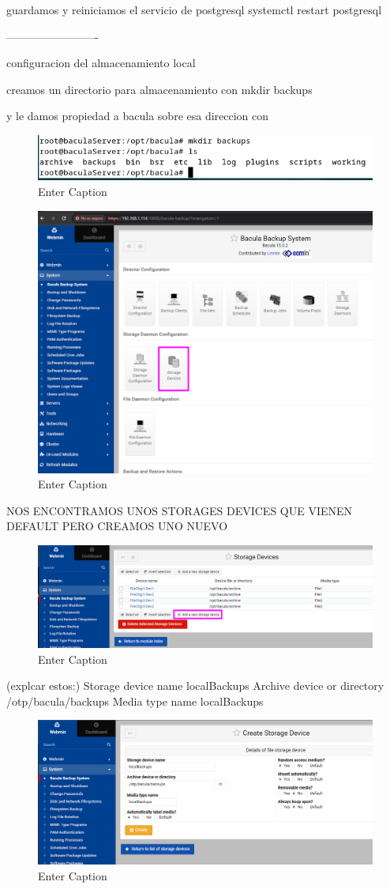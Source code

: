 guardamos y reiniciamos el servicio de postgresql
systemctl restart postgresql

-------------------------

configuracion del almacenamiento local

creamos un directorio para almacenamiento 
con mkdir backups

y le damos propiedad a bacula sobre esa direccion con 

\begin{figure}[H]
    \centering
    \includegraphics[width=0.5\linewidth]{instalacionBacula/mkdirbackups.png}
    \caption{Enter Caption}
\end{figure}



\begin{figure}[H]
    \centering
    \includegraphics[width=0.5\linewidth]{instalacionBacula/STO.png}
    \caption{Enter Caption}
\end{figure}


NOS ENCONTRAMOS UNOS STORAGES DEVICES QUE VIENEN DEFAULT
PERO CREAMOS UNO NUEVO
\begin{figure}[H]
    \centering
    \includegraphics[width=0.5\linewidth]{instalacionBacula/NSD.png}
    \caption{Enter Caption}
\end{figure}

(explcar estos:)
Storage device name
    localBackups
Archive device or directory
    /otp/bacula/backups
Media type name
    localBackups

\begin{figure}[H]
    \centering
    \includegraphics[width=0.5\linewidth]{instalacionBacula/localbac.png}
    \caption{Enter Caption}
\end{figure}


